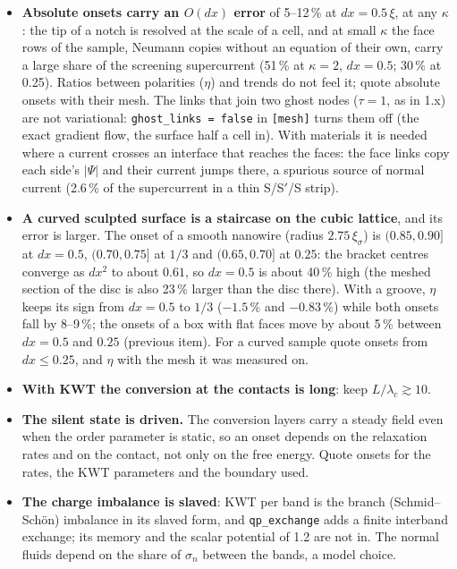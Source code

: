 \documentclass[11pt,a4paper]{article}
\newcommand{\code}[1]{\texttt{#1}}
\begin{document}
\begin{itemize}
\item \textbf{Absolute onsets carry an $O(dx)$ error} of 5--12\,\% at $dx = 0.5\,\xi$, at any $\kappa$: the tip of a
  notch is resolved at the scale of a cell, and at small $\kappa$ the face rows of the sample, Neumann copies without an
  equation of their own, carry a large share of the screening supercurrent (51\,\% at $\kappa = 2$, $dx = 0.5$; 30\,\%
  at 0.25). Ratios between polarities ($\eta$) and trends do not feel it; quote absolute onsets with their mesh. The links
  that join two ghost nodes ($\tau = 1$, as in 1.x) are not variational: \code{ghost\_links = false} in \code{[mesh]} turns
  them off (the exact gradient flow, the surface half a cell in). With materials it is needed where a current crosses an
  interface that reaches the faces: the face links copy each side's $|\Psi|$ and their current jumps there, a spurious source
  of normal current (2.6\,\% of the supercurrent in a thin S/S$'$/S strip).
\item \textbf{A curved sculpted surface is a staircase on the cubic lattice}, and its error is larger. The onset of a smooth
  nanowire (radius $2.75\,\xi_\sigma$) is $(0.85, 0.90]$ at $dx = 0.5$, $(0.70, 0.75]$ at $1/3$ and $(0.65, 0.70]$ at $0.25$: the bracket centres
  converge as $dx^2$ to about $0.61$, so $dx = 0.5$ is about 40\,\% high (the meshed section of the disc is also 23\,\% larger
  than the disc there). With a groove, $\eta$ keeps its sign from $dx = 0.5$ to $1/3$ ($-1.5\,\%$ and $-0.83\,\%$) while both
  onsets fall by 8--9\,\%; the onsets of a box with flat faces move by about 5\,\% between $dx = 0.5$ and $0.25$ (previous item). For a
  curved sample quote onsets from $dx \le 0.25$, and $\eta$ with the mesh it was measured on.
\item \textbf{With KWT the conversion at the contacts is long}: keep $L/\lambda_c \gtrsim 10$.
\item \textbf{The silent state is driven.} The conversion layers carry a steady field even when the order parameter is
  static, so an onset depends on the relaxation rates and on the contact, not only on the free energy. Quote onsets for
  the rates, the KWT parameters and the boundary used.
\item \textbf{The charge imbalance is slaved}: KWT per band is the branch (Schmid--Sch\"on) imbalance in its slaved form,
  and \code{qp\_exchange} adds a finite interband exchange; its memory and the scalar potential of 1.2 are not in. The normal
  fluids depend on the share of $\sigma_n$ between the bands, a model choice.

\end{itemize}
\end{document}
